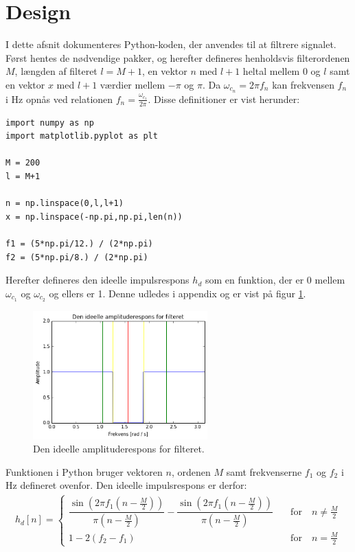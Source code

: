 \section{Design} \label{ch4_design}
I dette afsnit dokumenteres Python-koden, der anvendes til at filtrere signalet. Først hentes de nødvendige pakker, og herefter defineres henholdsvis filterordenen $M$, længden af filteret $l = M + 1$, en vektor $n$ med $l+1$ heltal mellem 0 og $l$ samt en vektor $x$ med $l+1$ værdier mellem $-\pi$ og $\pi$. Da $\omega_{c_n} = 2\pi f_n$ kan frekvensen $f_n$ i Hz opnås ved relationen $f_n = \frac{\omega_{c_1}}{2\pi}$. Disse definitioner er vist herunder:
\begin{lstlisting}
import numpy as np
import matplotlib.pyplot as plt

M = 200
l = M+1

n = np.linspace(0,l,l+1)
x = np.linspace(-np.pi,np.pi,len(n))

f1 = (5*np.pi/12.) / (2*np.pi)
f2 = (5*np.pi/8.) / (2*np.pi)
\end{lstlisting}

Herefter defineres den ideelle impulsrespons $h_d$ som en funktion, der er 0 mellem $\omega_{c_1}$ og $\omega_{c_2}$ og ellers er 1. Denne udledes i appendix og er vist på figur \ref{fig:ideel_amp_respons}.
\begin{figure}[H]
    \centering
    \includegraphics[width = 0.6\textwidth]{figures/ideel_amp_respons.PNG}
    \caption{Den ideelle amplituderespons for filteret.}
    \label{fig:ideel_amp_respons}
\end{figure}

Funktionen i Python bruger vektoren $n$, ordenen $M$ samt frekvenserne $f_1$ og $f_2$ i Hz defineret ovenfor. Den ideelle impulsrespons er derfor:
\begin{align*}
h_d[n] = \begin{cases} \dfrac{\sin\left(2 \pi f_1\left(n - \frac{M}{2}\right)\right)}{\pi\left(n - \frac{M}{2}\right)} - \dfrac{\sin\left(2\pi f_1\left(n - \frac{M}{2}\right)\right)}{\pi\left(n - \frac{M}{2}\right)} \quad &\text{for} \quad n \neq \frac{M}{2} \\
1 - 2(f_2 - f_1) \quad &\text{for} \quad n = \frac{M}{2}
\end{cases}
\end{align*}

